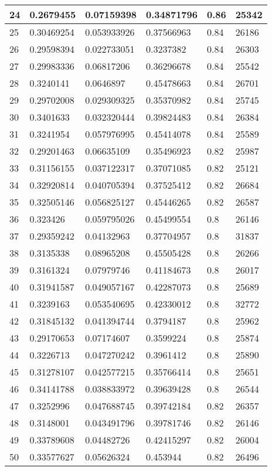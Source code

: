 \begin{longtable}{|l|l|l|l|l|l|}
24 & 0.2679455 & 0.07159398 & 0.34871796 & 0.86 & 25342 \\ \hline 
25 & 0.30469254 & 0.053933926 & 0.37566963 & 0.84 & 26186 \\ \hline 
26 & 0.29598394 & 0.022733051 & 0.3237382 & 0.84 & 26303 \\ \hline 
27 & 0.29983336 & 0.06817206 & 0.36296678 & 0.84 & 25542 \\ \hline 
28 & 0.3240141 & 0.0646897 & 0.45478663 & 0.84 & 26701 \\ \hline 
29 & 0.29702008 & 0.029309325 & 0.35370982 & 0.84 & 25745 \\ \hline 
30 & 0.3401633 & 0.032320444 & 0.39824483 & 0.84 & 26384 \\ \hline 
31 & 0.3241954 & 0.057976995 & 0.45414078 & 0.84 & 25589 \\ \hline 
32 & 0.29201463 & 0.06635109 & 0.35496923 & 0.82 & 25987 \\ \hline 
33 & 0.31156155 & 0.037122317 & 0.37071085 & 0.82 & 25121 \\ \hline 
34 & 0.32920814 & 0.040705394 & 0.37525412 & 0.82 & 26684 \\ \hline 
35 & 0.32505146 & 0.056825127 & 0.45446265 & 0.82 & 26587 \\ \hline 
36 & 0.323426 & 0.059795026 & 0.45499554 & 0.8 & 26146 \\ \hline 
37 & 0.29359242 & 0.04132963 & 0.37704957 & 0.8 & 31837 \\ \hline 
38 & 0.3135338 & 0.08965208 & 0.45505428 & 0.8 & 26266 \\ \hline 
39 & 0.3161324 & 0.07979746 & 0.41184673 & 0.8 & 26017 \\ \hline 
40 & 0.31941587 & 0.049057167 & 0.42287073 & 0.8 & 25689 \\ \hline 
41 & 0.3239163 & 0.053540695 & 0.42330012 & 0.8 & 32772 \\ \hline 
42 & 0.31845132 & 0.041394744 & 0.3794187 & 0.8 & 25962 \\ \hline 
43 & 0.29170653 & 0.07174607 & 0.3599224 & 0.8 & 25874 \\ \hline 
44 & 0.3226713 & 0.047270242 & 0.3961412 & 0.8 & 25890 \\ \hline 
45 & 0.31278107 & 0.042577215 & 0.35766414 & 0.8 & 25651 \\ \hline 
46 & 0.34141788 & 0.038833972 & 0.39639428 & 0.8 & 26544 \\ \hline 
47 & 0.3252996 & 0.047688745 & 0.39742184 & 0.82 & 26357 \\ \hline 
48 & 0.3148001 & 0.043491796 & 0.39781746 & 0.82 & 26146 \\ \hline 
49 & 0.33789608 & 0.04482726 & 0.42415297 & 0.82 & 26004 \\ \hline 
50 & 0.33577627 & 0.05626324 & 0.453944 & 0.82 & 26496 \\ \hline 
\end{longtable}